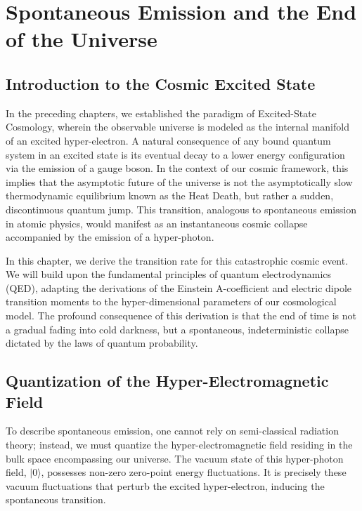 \section{Spontaneous Emission and the End of the Universe}

\subsection{Introduction to the Cosmic Excited State}
In the preceding chapters, we established the paradigm of Excited-State Cosmology, wherein the observable universe is modeled as the internal manifold of an excited hyper-electron. A natural consequence of any bound quantum system in an excited state is its eventual decay to a lower energy configuration via the emission of a gauge boson. In the context of our cosmic framework, this implies that the asymptotic future of the universe is not the asymptotically slow thermodynamic equilibrium known as the Heat Death, but rather a sudden, discontinuous quantum jump. This transition, analogous to spontaneous emission in atomic physics, would manifest as an instantaneous cosmic collapse accompanied by the emission of a hyper-photon. \cite{Zwicky1933, Starobinsky1980, Smoot1992}

In this chapter, we derive the transition rate for this catastrophic cosmic event. We will build upon the fundamental principles of quantum electrodynamics (QED), adapting the derivations of the Einstein A-coefficient and electric dipole transition moments to the hyper-dimensional parameters of our cosmological model. The profound consequence of this derivation is that the end of time is not a gradual fading into cold darkness, but a spontaneous, indeterministic collapse dictated by the laws of quantum probability.

\subsection{Quantization of the Hyper-Electromagnetic Field}
To describe spontaneous emission, one cannot rely on semi-classical radiation theory; instead, we must quantize the hyper-electromagnetic field residing in the bulk space encompassing our universe. The vacuum state of this hyper-photon field, $|0\rangle$, possesses non-zero zero-point energy fluctuations. It is precisely these vacuum fluctuations that perturb the excited hyper-electron, inducing the spontaneous transition.

